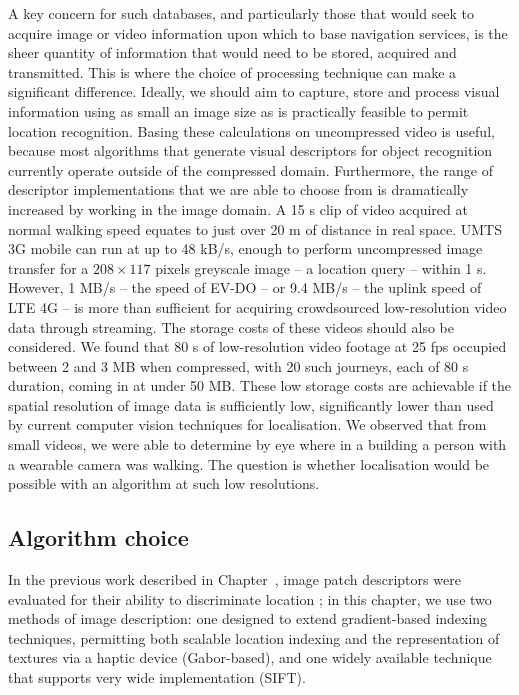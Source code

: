 A key concern for such databases, and particularly those that would seek to acquire image or video information upon which to base navigation services, is the sheer quantity of information that would need to be stored, acquired and transmitted.  This is where the choice of processing technique can make a significant difference.  Ideally, we should aim to capture, store and process visual information using as small an image size as is practically feasible to permit location recognition.  Basing these calculations on uncompressed video is useful, because most algorithms that generate visual descriptors for object recognition currently operate outside of the compressed domain. Furthermore, the range of descriptor implementations that we are able to choose from is dramatically increased by working in the image domain.  A 15 s clip of video acquired at normal walking speed equates to just over 20 m of distance in real space. UMTS 3G mobile can run at up to 48 kB/s, enough to perform uncompressed image transfer for a $208 \times 117$ pixels greyscale image -- a location query -- within 1 s.  However, 1 MB/s -- the speed of EV-DO \citep{bhushan2006cdma2000} -- or 9.4 MB/s -- the uplink speed of LTE 4G --  is more than sufficient for acquiring crowdsourced low-resolution video data through streaming.  The storage costs of these videos should also be considered.  We found that 80 s of low-resolution video footage at 25 fps occupied between 2 and 3 MB when compressed, with 20 such journeys, each of 80 s duration, coming in at under 50 MB.  These low storage costs are achievable if the spatial resolution of image data is sufficiently low, significantly lower than used by current computer vision techniques for localisation. We observed that from small videos, we were able to determine by eye where in a building a person with a wearable camera was walking. The question is whether localisation would be possible with an algorithm at such low resolutions.  \\

\subsection{Algorithm choice} In the previous work described in Chapter~\cite{ch:chapter4}, image patch descriptors were evaluated for their ability to discriminate location \citep{Rivera-Rubio2015PRL}; in this chapter, we use two methods of image description: one designed to extend gradient-based indexing techniques, permitting both scalable location indexing and the representation of textures via a haptic device (Gabor-based), and one widely available technique that supports very wide implementation (SIFT). 

